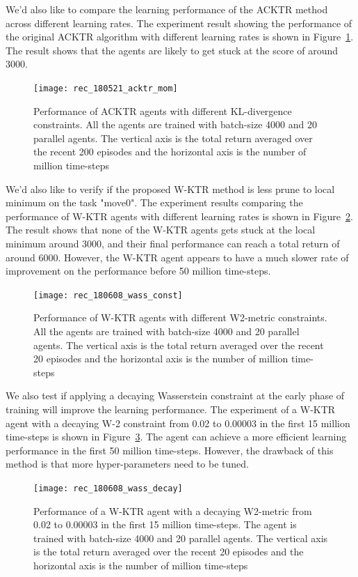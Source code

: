 We'd also like to compare the learning performance of the ACKTR method across different learning rates. The experiment result showing the performance of the original ACKTR algorithm with different learning rates is shown in Figure~\ref{fig_acktr_mom_tune}. The result shows that the agents are likely to get stuck at the score of around 3000. 
\begin{figure}[!htbp]
	\texttt{[image: rec\_180521\_acktr\_mom]}
	\centering
	\caption{Performance of ACKTR agents with different KL-divergence constraints. All the agents are trained with batch-size 4000 and 20 parallel agents. The vertical axis is the total return averaged over the recent 200 episodes and the horizontal axis is the number of million time-steps}\label{fig_acktr_mom_tune}
\end{figure}

We'd also like to verify if the proposed W-KTR method is less prune to local minimum on the task "move0". The experiment results comparing the performance of W-KTR agents with different learning rates is shown in Figure~\ref{fig_wass_const_tune}. The result shows that none of the W-KTR agents gets stuck at the local minimum around 3000, and their final performance can reach a total return of around 6000. However, the W-KTR agent appears to have a much slower rate of improvement on the performance before 50 million time-steps.
\begin{figure}[!htbp]
	\texttt{[image: rec\_180608\_wass\_const]}
	\centering
	\caption{Performance of W-KTR agents with different W2-metric constraints. All the agents are trained with batch-size 4000 and 20 parallel agents. The vertical axis is the total return averaged over the recent 20 episodes and the horizontal axis is the number of million time-steps}\label{fig_wass_const_tune}
\end{figure}

We also test if applying a decaying Wasserstein constraint at the early phase of training will improve the learning performance. The experiment of a W-KTR agent with a decaying W-2 constraint from 0.02 to 0.00003 in the first 15 million time-steps is shown in Figure~\ref{fig_wass_decay}. The agent can achieve a more efficient learning performance in the first 50 million time-steps. However, the drawback of this method is that more hyper-parameters need to be tuned.
\begin{figure}[!htbp]
	\texttt{[image: rec\_180608\_wass\_decay]}
	\centering
	\caption{Performance of a W-KTR agent with a decaying W2-metric from 0.02 to 0.00003 in the first 15 million time-steps. The agent is trained with batch-size 4000 and 20 parallel agents. The vertical axis is the total return averaged over the recent 20 episodes and the horizontal axis is the number of million time-steps}\label{fig_wass_decay}
\end{figure}

